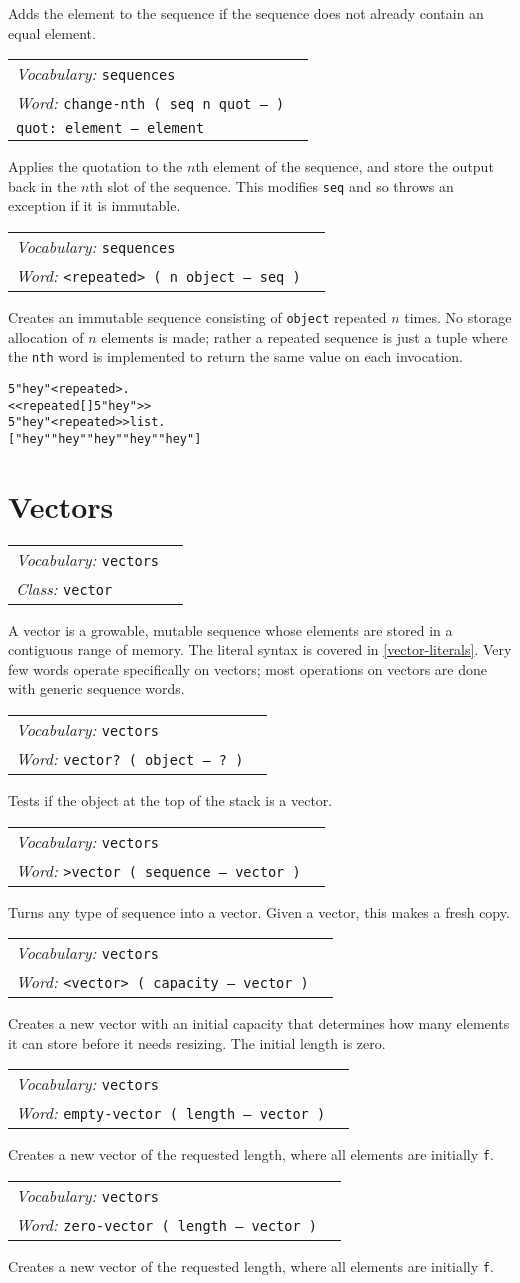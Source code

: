 \documentclass{book}
\newcommand{\vocabulary}[1]{\emph{Vocabulary:} \texttt{#1}&\\}
\newcommand{\ordinaryword}[2]{\index{\texttt{#1}}\emph{Word:} \texttt{#2}&\\}
\newcommand{\classword}[1]{\index{\texttt{#1}}\emph{Class:} \texttt{#1}&\\}
\newcommand{\wordtable}[1]{


\begin{tabularx}{12cm}{lX}
\hline
#1
\hline
\end{tabularx}

}
\begin{document}
Adds the element to the sequence if the sequence does not already contain an equal element.

\wordtable{
\vocabulary{sequences}
\ordinaryword{change-nth}{change-nth ( seq n quot -- )}
\texttt{quot:~element -- element}\\
}
Applies the quotation to the $n$th element of the sequence, and store the output back in the $n$th slot of the sequence. This modifies \texttt{seq} and so throws an exception if it is immutable.
\wordtable{
\vocabulary{sequences}
\ordinaryword{<repeated>}{<repeated> ( n object -- seq )}
}
Creates an immutable sequence consisting of \verb|object| repeated $n$ times. No storage allocation of $n$ elements is made; rather a repeated sequence is just a tuple where the \verb|nth| word is implemented to return the same value on each invocation.
\begin{alltt}
  5 "hey" <repeated> .
<< repeated [ ] 5 "hey" >>
  5 "hey" <repeated> >list .
[ "hey" "hey" "hey" "hey" "hey" ]
\end{alltt}


\section{Vectors}\label{vectors}

\wordtable{
\vocabulary{vectors}
\classword{vector}
}
\vectorglos
A vector is a growable, mutable sequence whose elements are stored in a contiguous range of memory. The literal syntax is covered in \ref{vector-literals}. Very few words operate specifically on vectors; most operations on vectors are done with generic sequence words.

\wordtable{
\vocabulary{vectors}
\ordinaryword{vector?}{vector?~( object -- ?~)}

}
Tests if the object at the top of the stack is a vector.
\wordtable{
\vocabulary{vectors}
\ordinaryword{>vector}{>vector~( sequence -- vector )}
}
Turns any type of sequence into a vector. Given a vector, this makes a fresh copy.
\wordtable{
\vocabulary{vectors}
\ordinaryword{<vector>}{<vector>~( capacity -- vector )}
}
Creates a new vector with an initial capacity that determines how many elements it can store before it needs resizing. The initial length is zero.
\wordtable{
\vocabulary{vectors}
\ordinaryword{empty-vector}{empty-vector~( length -- vector )}
}
Creates a new vector of the requested length, where all elements are initially \texttt{f}.
\wordtable{
\vocabulary{vectors}
\ordinaryword{zero-vector}{zero-vector~( length -- vector )}
}
Creates a new vector of the requested length, where all elements are initially \texttt{f}.
\end{document}
